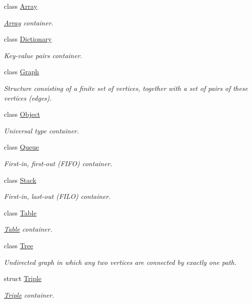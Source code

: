 \begin{DoxyCompactItemize}
\item 
class \hyperlink{classlibrary_1_1core_1_1ctnr_1_1_array}{Array}
\begin{DoxyCompactList}\small\item\em \hyperlink{classlibrary_1_1core_1_1ctnr_1_1_array}{Array} container. \end{DoxyCompactList}\item 
class \hyperlink{classlibrary_1_1core_1_1ctnr_1_1_dictionary}{Dictionary}
\begin{DoxyCompactList}\small\item\em Key-\/value pairs container. \end{DoxyCompactList}\item 
class \hyperlink{classlibrary_1_1core_1_1ctnr_1_1_graph}{Graph}
\begin{DoxyCompactList}\small\item\em Structure consisting of a finite set of vertices, together with a set of pairs of these vertices (edges). \end{DoxyCompactList}\item 
class \hyperlink{classlibrary_1_1core_1_1ctnr_1_1_object}{Object}
\begin{DoxyCompactList}\small\item\em Universal type container. \end{DoxyCompactList}\item 
class \hyperlink{classlibrary_1_1core_1_1ctnr_1_1_queue}{Queue}
\begin{DoxyCompactList}\small\item\em First-\/in, first-\/out (F\+I\+FO) container. \end{DoxyCompactList}\item 
class \hyperlink{classlibrary_1_1core_1_1ctnr_1_1_stack}{Stack}
\begin{DoxyCompactList}\small\item\em First-\/in, last-\/out (F\+I\+LO) container. \end{DoxyCompactList}\item 
class \hyperlink{classlibrary_1_1core_1_1ctnr_1_1_table}{Table}
\begin{DoxyCompactList}\small\item\em \hyperlink{classlibrary_1_1core_1_1ctnr_1_1_table}{Table} container. \end{DoxyCompactList}\item 
class \hyperlink{classlibrary_1_1core_1_1ctnr_1_1_tree}{Tree}
\begin{DoxyCompactList}\small\item\em Undirected graph in which any two vertices are connected by exactly one path. \end{DoxyCompactList}\item 
struct \hyperlink{structlibrary_1_1core_1_1ctnr_1_1_triple}{Triple}
\begin{DoxyCompactList}\small\item\em \hyperlink{structlibrary_1_1core_1_1ctnr_1_1_triple}{Triple} container. \end{DoxyCompactList}\end{DoxyCompactItemize}

